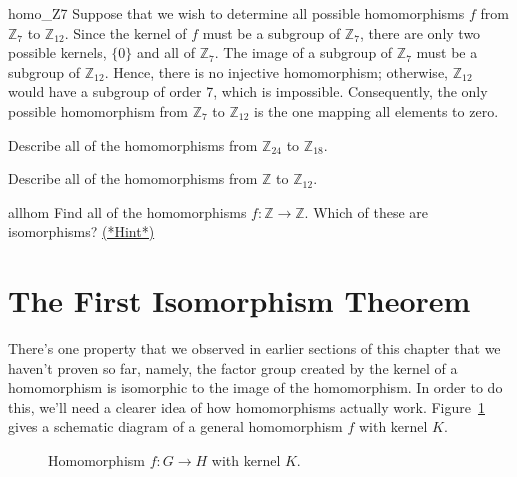 \begin{example}{homo_Z7}
Suppose that we wish to determine all possible homomorphisms $f$
from ${\mathbb Z}_7$ to  ${\mathbb Z}_{12}$. Since the kernel of $f$ must
be a subgroup of  ${\mathbb Z}_7$, there are only two possible
kernels, $\{ 0 \}$ and all of ${\mathbb Z}_7$.  The image of a subgroup
of ${\mathbb Z}_7$ must be a subgroup of ${\mathbb Z}_{12}$. Hence, there is
no injective homomorphism; otherwise, ${\mathbb Z}_{12}$ would have a
subgroup of order 7, which is impossible. Consequently, the only
possible homomorphism from ${\mathbb Z}_7$ to  ${\mathbb Z}_{12}$ is the one
mapping all elements to zero. 
\end{example}

\begin{exercise}{}
Describe all of the homomorphisms from ${\mathbb Z}_{24}$ to ${\mathbb
Z}_{18}$. 
\end{exercise} 
 
\begin{exercise}{}
Describe all of the homomorphisms from ${\mathbb Z}$ to ${\mathbb Z}_{12}$. 
\end{exercise} 

\begin{exercise}{allhom}
Find all of the homomorphisms $f : {\mathbb Z} \rightarrow {\mathbb Z}$.
Which of these are isomorphisms?
\hyperref[sec:homomorph:hints]{(*Hint*)} 
\end{exercise} 

 
\section{The First Isomorphism Theorem}
 
There's one property that we observed in earlier sections of this chapter that we haven't proven so far, namely,  the factor group created by the kernel of a homomorphism is isomorphic to the image of the homomorphism.  In order to do this, we'll need a clearer idea of how homomorphisms actually work. Figure~\ref{fig:homomorph3} gives a schematic diagram of a general homomorphism $f$ with kernel $K$. 
\begin{figure}[htb]
	  \caption{\label{fig:homomorph3} Homomorphism $f:G \rightarrow H$ with kernel $K$. }
\end{figure}


